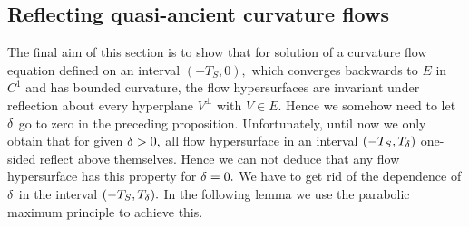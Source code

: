 \documentclass{amsart}
\begin{document}
\subsection{Reflecting quasi-ancient curvature flows}

The final aim of this section is to show that for solution of a curvature flow equation defined on an interval $(-T_{S},0),$ which converges backwards to $E$ in $C^{1}$ and has bounded curvature, the flow hypersurfaces are invariant under reflection about every hyperplane $V^{\perp}$ with $V\in E.$ Hence we somehow need to let $\delta$ go to zero in the preceding proposition. Unfortunately, until now we only obtain that for given $\delta>0,$ all flow hypersurface in an interval $(-T_{S},T_{\delta})$ one-sided reflect above themselves. Hence we can not deduce that any flow hypersurface has this property for $\delta=0.$ We have to get rid of the dependence of $\delta$ in the interval $(-T_{S},T_{\delta}).$ In the following lemma we use the parabolic maximum principle to achieve this.

\end{document}
